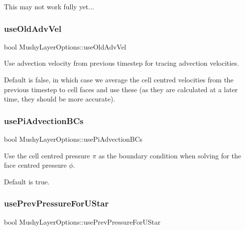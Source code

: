 This may not work fully yet... \mbox{\label{struct_mushy_layer_options_a4e2bb36126700e04d36012af3412c817}} 
\subsubsection{\texorpdfstring{use\+Old\+Adv\+Vel}{useOldAdvVel}}
{\footnotesize\ttfamily bool Mushy\+Layer\+Options\+::use\+Old\+Adv\+Vel}



Use advection velocity from previous timestep for tracing advection velocities. 

Default is false, in which case we average the cell centred velocities from the previous timestep to cell faces and use these (as they are calculated at a later time, they should be more accurate). \mbox{\label{struct_mushy_layer_options_a2ac51724bee29034037c2c26f320ee11}} 
\subsubsection{\texorpdfstring{use\+Pi\+Advection\+B\+Cs}{usePiAdvectionBCs}}
{\footnotesize\ttfamily bool Mushy\+Layer\+Options\+::use\+Pi\+Advection\+B\+Cs}



Use the cell centred pressure $ \pi $ as the boundary condition when solving for the face centred pressure $ \phi $. 

Default is true. \mbox{\label{struct_mushy_layer_options_ac2ad0fd5e02c9c4bd42ac2f4f04d15df}} 
\subsubsection{\texorpdfstring{use\+Prev\+Pressure\+For\+U\+Star}{usePrevPressureForUStar}}
{\footnotesize\ttfamily bool Mushy\+Layer\+Options\+::use\+Prev\+Pressure\+For\+U\+Star}



